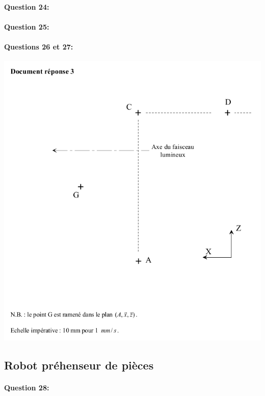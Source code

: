\paragraph{Question 24:}

\reponse[6]

\paragraph{Question 25:}

\reponse[2]

\newpage

\paragraph{Questions 26 et 27:}

\begin{center}
  \includegraphics[width=0.8\linewidth]{img/rep14}
\end{center}

\reponse[2]

\cleardoublepage

\subsection{Robot préhenseur de pièces}

\paragraph{Question 28:}

